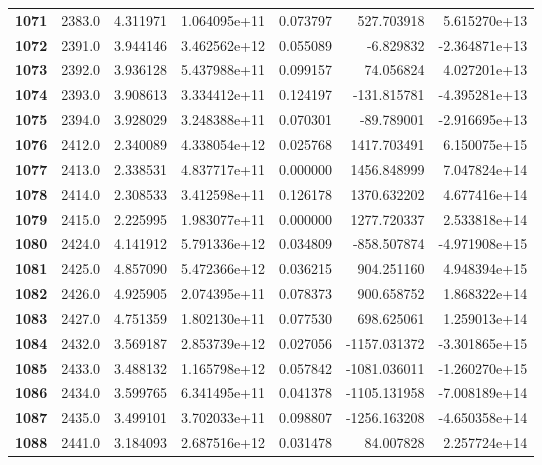 \documentclass{report}[12pt]
\begin{document}
\begin{center}
\begin{tabular}{lrrrrrr}
\textbf{1071} &         2383.0 &   4.311971 &  1.064095e+11 &    0.073797 &   527.703918 &  5.615270e+13 \\
\textbf{1072} &         2391.0 &   3.944146 &  3.462562e+12 &    0.055089 &    -6.829832 & -2.364871e+13 \\
\textbf{1073} &         2392.0 &   3.936128 &  5.437988e+11 &    0.099157 &    74.056824 &  4.027201e+13 \\
\textbf{1074} &         2393.0 &   3.908613 &  3.334412e+11 &    0.124197 &  -131.815781 & -4.395281e+13 \\
\textbf{1075} &         2394.0 &   3.928029 &  3.248388e+11 &    0.070301 &   -89.789001 & -2.916695e+13 \\
\textbf{1076} &         2412.0 &   2.340089 &  4.338054e+12 &    0.025768 &  1417.703491 &  6.150075e+15 \\
\textbf{1077} &         2413.0 &   2.338531 &  4.837717e+11 &    0.000000 &  1456.848999 &  7.047824e+14 \\
\textbf{1078} &         2414.0 &   2.308533 &  3.412598e+11 &    0.126178 &  1370.632202 &  4.677416e+14 \\
\textbf{1079} &         2415.0 &   2.225995 &  1.983077e+11 &    0.000000 &  1277.720337 &  2.533818e+14 \\
\textbf{1080} &         2424.0 &   4.141912 &  5.791336e+12 &    0.034809 &  -858.507874 & -4.971908e+15 \\
\textbf{1081} &         2425.0 &   4.857090 &  5.472366e+12 &    0.036215 &   904.251160 &  4.948394e+15 \\
\textbf{1082} &         2426.0 &   4.925905 &  2.074395e+11 &    0.078373 &   900.658752 &  1.868322e+14 \\
\textbf{1083} &         2427.0 &   4.751359 &  1.802130e+11 &    0.077530 &   698.625061 &  1.259013e+14 \\
\textbf{1084} &         2432.0 &   3.569187 &  2.853739e+12 &    0.027056 & -1157.031372 & -3.301865e+15 \\
\textbf{1085} &         2433.0 &   3.488132 &  1.165798e+12 &    0.057842 & -1081.036011 & -1.260270e+15 \\
\textbf{1086} &         2434.0 &   3.599765 &  6.341495e+11 &    0.041378 & -1105.131958 & -7.008189e+14 \\
\textbf{1087} &         2435.0 &   3.499101 &  3.702033e+11 &    0.098807 & -1256.163208 & -4.650358e+14 \\
\textbf{1088} &         2441.0 &   3.184093 &  2.687516e+12 &    0.031478 &    84.007828 &  2.257724e+14 \\

\end{tabular}
\end{center}
\end{document}
